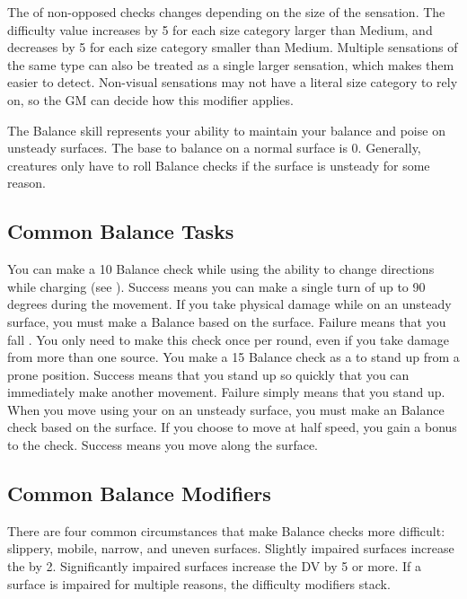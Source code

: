         The  of non-opposed checks changes depending on the size of the sensation.
        The difficulty value increases by 5 for each size category larger than Medium, and decreases by 5 for each size category smaller than Medium.
        Multiple sensations of the same type can also be treated as a single larger sensation, which makes them easier to detect.
        Non-visual sensations may not have a literal size category to rely on, so the GM can decide how this modifier applies.

\newpage
{}
    The Balance skill represents your ability to maintain your balance and poise on unsteady surfaces.
    The base  to balance on a normal surface is 0.
    Generally, creatures only have to roll Balance checks if the surface is unsteady for some reason.

    \subsection{Common Balance Tasks}
         You can make a  10 Balance check while using the  ability to change directions while charging (see ).
        Success means you can make a single turn of up to 90 degrees during the movement.
         If you take physical damage while on an unsteady surface, you must make a Balance  based on the surface.
        Failure means that you fall \prone.
        You only need to make this check once per round, even if you take damage from more than one source.
         You make a  15 Balance check as a  to stand up from a prone position.
        Success means that you stand up so quickly that you can immediately make another movement.
        Failure simply means that you stand up.
         When you move using your  on an unsteady surface, you must make an Balance check based on the surface.
        If you choose to move at half speed, you gain a  bonus to the check.
        Success means you move along the surface.

    \subsection{Common Balance Modifiers}
        There are four common circumstances that make Balance checks more difficult: slippery, mobile, narrow, and uneven surfaces.
        Slightly impaired surfaces increase the  by 2.
        Significantly impaired surfaces increase the DV by 5 or more.
        If a surface is impaired for multiple reasons, the difficulty modifiers stack.

